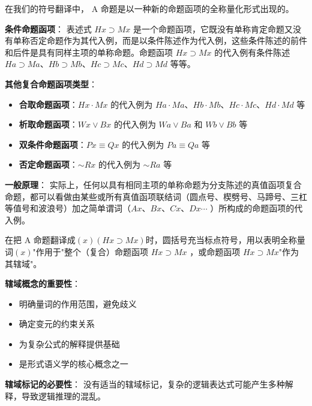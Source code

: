 \begin{theorembox}[title=复合命题函项的结构分析]
在我们的符号翻译中， A 命题是以一种新的命题函项的全称量化形式出现的。

\textbf{条件命题函项}：
表述式 $H x \supset M x$ 是一个命题函项，它既没有单称肯定命题又没有单称否定命题作为其代入例，而是以条件陈述作为代入例，这些条件陈述的前件和后件是具有同样主项的单称命题。命题函项 $H x \supset M x$ 的代入例有条件陈述 $H a \supset M a 、 H b \supset M b 、 H c \supset M c 、 H d \supset M d$ 等等。

\textbf{其他复合命题函项类型}：
\begin{itemize}
\item \textbf{合取命题函项}：$H x \cdot M x$ 的代入例为 $H a \cdot M a 、 H b \cdot M b 、 H c \cdot M c 、 H d \cdot M d$ 等
\item \textbf{析取命题函项}：$W x \vee B x$ 的代入例为 $W a \vee B a$ 和 $W b \vee B b$ 等
\item \textbf{双条件命题函项}：$P x \equiv Q x$ 的代入例为 $P a \equiv Q a$ 等
\item \textbf{否定命题函项}：$\sim R x$ 的代入例为 $\sim R a$ 等
\end{itemize}

\textbf{一般原理}：
实际上，任何以具有相同主项的单称命题为分支陈述的真值函项复合命题，都可以看做由某些或所有真值函项联结词（圆点号、楔劈号、马蹄号、三杠等值号和波浪号）加之简单谓词（$A x 、 B x 、 C x 、 D x \cdots$ ）所构成的命题函项的代入例。
\end{theorembox}

\begin{examplebox}[title=量词辖域的重要性]
在把 A 命题翻译成$(x)(H x \supset M x)$时，圆括号充当标点符号，用以表明全称量词$(x)$"作用于"整个（复合）命题函项 $H x \supset M x$ ，或命题函项 $H x \supset M x$"作为其辖域"。

\textbf{辖域概念的重要性}：
\begin{itemize}
\item 明确量词的作用范围，避免歧义
\item 确定变元的约束关系
\item 为复杂公式的解释提供基础
\item 是形式语义学的核心概念之一
\end{itemize}

\textbf{辖域标记的必要性}：
没有适当的辖域标记，复杂的逻辑表达式可能产生多种解释，导致逻辑推理的混乱。
\end{examplebox}

